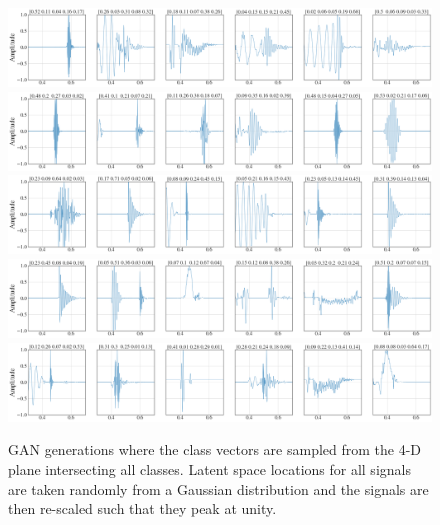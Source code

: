 \documentclass[12pt]{iopart}
\begin{document}
\begin{figure}
    \centering
    \includegraphics[width=\textwidth]{figures/generations/simplex_sample1.png}
    \includegraphics[width=\textwidth]{figures/generations/simplex_sample2.png}
    \includegraphics[width=\textwidth]{figures/generations/simplex_sample3.png}
    \includegraphics[width=\textwidth]{figures/generations/simplex_sample4.png}
    \includegraphics[width=\textwidth]{figures/generations/simplex_sample5.png}
    \caption{GAN generations where the class vectors are sampled from the 4-D
plane intersecting all classes. Latent space locations for all signals are taken randomly from a Gaussian distribution and the signals are then re-scaled such that they peak at unity.}
    \label{fig:simplexd_samples}
\end{figure}
\end{document}
